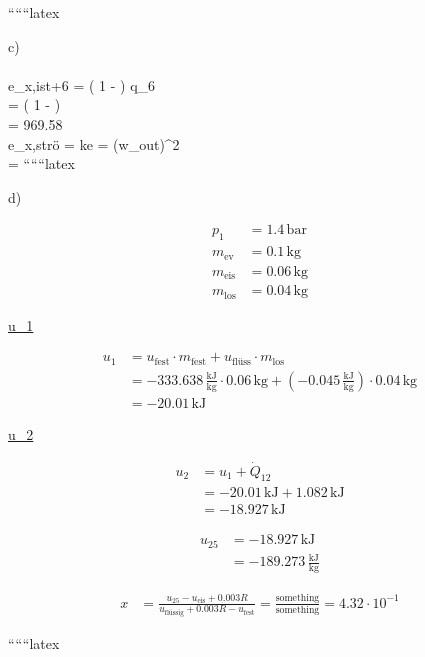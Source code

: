 ``````latex

c) \\
 \\
e_{x,ist+6} = \left( 1 -  \right) \cdot q_6 \\
= \left( 1 -  \right)  \,  \\
= 969.58 \,  \\

e_{x,strö} =  \cdot ke =   (w_{out})^2 \\
= 
``````latex

d)

\begin{align*}
p_1 &= 1.4 \, \text{bar} \\
m_{\text{ev}} &= 0.1 \, \text{kg} \\
m_{\text{eis}} &= 0.06 \, \text{kg} \\
m_{\text{los}} &= 0.04 \, \text{kg}
\end{align*}

\underline{u_1}

\begin{align*}
u_1 &= u_{\text{fest}} \cdot m_{\text{fest}} + u_{\text{flüss}} \cdot m_{\text{los}} \\
&= -333.638 \, \frac{\text{kJ}}{\text{kg}} \cdot 0.06 \, \text{kg} + (-0.045 \, \frac{\text{kJ}}{\text{kg}}) \cdot 0.04 \, \text{kg} \\
&= -20.01 \, \text{kJ}
\end{align*}

\underline{u_2}

\begin{align*}
u_2 &= u_1 + \dot{Q}_{12} \\
&= -20.01 \, \text{kJ} + 1.082 \, \text{kJ} \\
&= -18.927 \, \text{kJ}
\end{align*}

\begin{align*}
u_{25} &= -18.927 \, \text{kJ} \\
&= -189.273 \, \frac{\text{kJ}}{\text{kg}}
\end{align*}

\begin{align*}
x &= \frac{u_{25} - u_{\text{eis}} + 0.003R}{u_{\text{flüssig}} + 0.003R - u_{\text{fest}}} = \frac{\text{something}}{\text{something}} = 4.32 \cdot 10^{-1}
\end{align*}

``````latex



